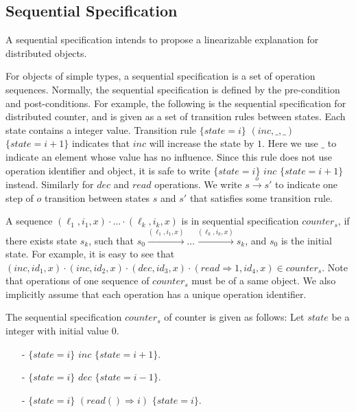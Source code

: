 


\subsection{Sequential Specification}
\label{subsec:sequential specification}

A sequential specification intends to propose a linearizable explanation for distributed objects.

For objects of simple types, a sequential specification is a set of operation sequences. Normally, the sequential specification is defined by the pre-condition and post-conditions. For example, the following is the sequential specification for distributed counter, and is given as a set of transition rules between states. Each state contains a integer value. Transition rule $\{ \mathit{state} = i \}$ $(\mathit{inc},\_,\_)$ $\{ \mathit{state} = i+1 \}$ indicates that $\mathit{inc}$ will increase the state by $1$. Here we use $\_$ to indicate an element whose value has no influence. Since this rule does not use operation identifier and object, it is safe to write $\{ \mathit{state} = i \}$ $\mathit{inc}$ $\{ \mathit{state} = i+1 \}$ instead. Similarly for $\mathit{dec}$ and $\mathit{read}$ operations. We write $s {\xrightarrow{o}} s'$ to indicate one step of $o$ transition between states $s$ and $s'$ that satisfies some transition rule.

A sequence $(\ell_1,i_1,x) \cdot \ldots \cdot (\ell_k,i_k,x)$ is in sequential specification $\mathit{counter}_s$, if there exists state $s_k$, such that $s_0 {\xrightarrow{(\ell_1,i_1,x)}} \ldots {\xrightarrow{(\ell_k,i_k,x)}} s_k$, and $s_0$ is the initial state. For example, it is easy to see that $(\mathit{inc},\mathit{id}_1,x) \cdot (\mathit{inc},\mathit{id}_2,x) \cdot (\mathit{dec},\mathit{id}_3,x) \cdot (\mathit{read} \Rightarrow 1,\mathit{id}_4,x) \in \mathit{counter}_s$. Note that operations of one sequence of $\mathit{counter}_s$ must be of a same object. We also implicitly assume that each operation has a unique operation identifier.


\begin{example}
\label{definition:sequential specification of counter}
The sequential specification $\mathit{counter}_s$ of counter is given as follows: Let $\mathit{state}$ be a integer with initial value $0$.

\begin{itemize}
\setlength{\itemsep}{0.5pt}
\item[-] $\{ \mathit{state} = i \}$ $\mathit{inc}$ $\{ \mathit{state} = i+1 \}$.
\item[-] $\{ \mathit{state} = i \}$ $\mathit{dec}$ $\{ \mathit{state} = i-1 \}$.
\item[-] $\{ \mathit{state} = i \}$ $(\mathit{read}() \Rightarrow i)$ $\{ \mathit{state} = i \}$.
\end{itemize}
\end{example}

